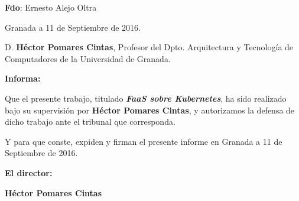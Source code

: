 \vspace{2cm}

\noindent \textbf{Fdo}: Ernesto Alejo Oltra

\vspace{2cm}

\begin{flushright}
    Granada a 11 de Septiembre de 2016.
\end{flushright}

\newpage\null\thispagestyle{empty}

D. \textbf{Héctor Pomares Cintas}, Profesor del Dpto. Arquitectura y Tecnología
de Computadores de la Universidad de Granada.

\vspace{0.5cm}

\textbf{Informa:}

\vspace{0.5cm}

Que el presente trabajo, titulado \textit{\textbf{FaaS sobre Kubernetes}}, ha sido
realizado bajo su supervisión por \textbf{Héctor Pomares Cintas}, y autorizamos
la defensa de dicho trabajo ante el tribunal que corresponda.

\vspace{0.5cm}

Y para que conste, expiden y firman el presente informe en Granada a
11 de Septiembre de 2016.

\vspace{1cm}

\textbf{El director:}

\vspace{1cm}

\noindent \textbf{Héctor Pomares Cintas}



\tableofcontents
\thispagestyle{empty}



\listoffigures
\thispagestyle{empty}



\listoftables
\thispagestyle{empty}

\newpage\null\thispagestyle{empty}\newpage
